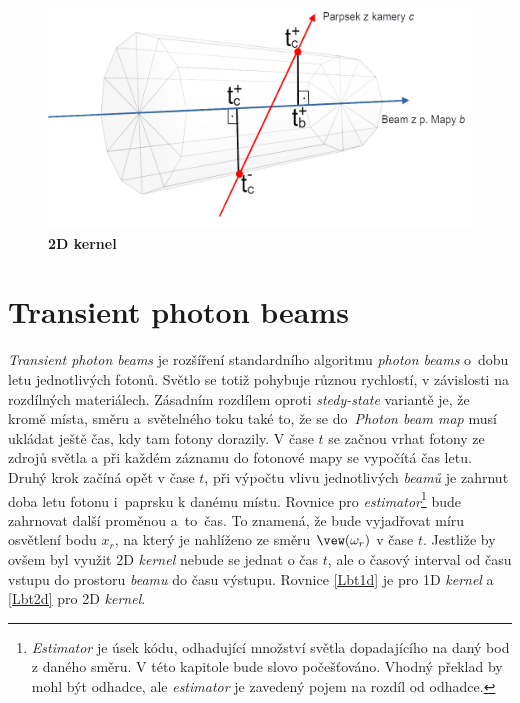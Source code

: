 \begin{figure}[h]\centering
\includegraphics[width=0.7\linewidth]{obrazky-figures/2DKernel.png}\hfill
  \caption{\textbf{2D kernel}}
  \label{2d}
\end{figure}
\section{Transient photon beams} 
\textit{Transient photon beams}\cite{transient_pb} je rozšíření standardního algoritmu \textit{photon beams} o~dobu letu jednotlivých fotonů. Světlo se totiž pohybuje různou rychlostí, v závislosti na rozdílných materiálech. Zásadním rozdílem oproti \textit{stedy-state} variantě je, že kromě místa, směru a~světelného toku také to, že se do~\textit{Photon beam map} musí ukládat ještě čas, kdy tam fotony dorazily. V čase $t$ se začnou vrhat fotony ze zdrojů světla a při každém záznamu do fotonové mapy se vypočítá čas letu.
Druhý krok začíná opět v čase $t$, při výpočtu vlivu jednotlivých \textit{beamů} je zahrnut doba letu fotonu i~paprsku k danému místu.  
Rovnice pro \textit{estimator}\footnote{\textit{Estimator} je úsek kódu, odhadující množství světla dopadajícího na daný bod z daného směru. V této kapitole bude slovo počešťováno. Vhodný překlad by mohl být odhadce, ale \textit{estimator} je zavedený pojem na rozdíl od odhadce.} bude zahrnovat další proměnou a~to~čas. To znamená, že bude vyjadřovat míru osvětlení bodu $x_r$, na který je nahlíženo ze směru $\vew(\omega_r)$ v čase $t$. Jestliže by ovšem byl využit 2D \textit{kernel} nebude se jednat o čas $t$, ale o časový interval od času vstupu do prostoru \textit{beamu} do času výstupu.
Rovnice \ref{Lbt1d} je pro 1D \textit{kernel} a  \ref{Lbt2d} pro 2D \textit{kernel}\cite{ptpb}.

